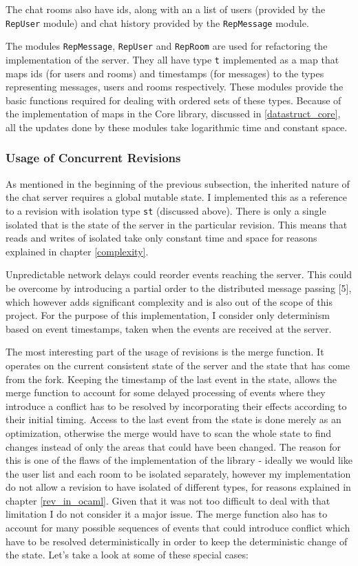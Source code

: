 \documentclass[12pt,twoside,notitlepage]{report}
\begin{document}
{The chat rooms also have ids, along with an a list of users (provided by the {\tt RepUser} module) and chat history provided by the {\tt RepMessage} module.

The modules {\tt RepMessage}, {\tt RepUser} and {\tt RepRoom} are used for refactoring the implementation of the server. They all have type {\tt t} implemented as a map that maps ids (for users and rooms) and timestamps (for messages) to the types representing messages, users and rooms respectively. These modules provide the basic functions required for dealing with ordered sets of these types. Because of the implementation of maps in the Core library, discussed in \ref{datastruct_core}, all the updates done by these modules take logarithmic time and constant space.     

\subsubsection{Usage of Concurrent Revisions}

As mentioned in the beginning of the previous subsection, the inherited nature of the chat server requires a global mutable state. I implemented this as a reference to a revision with isolation type {\tt st} (discussed above). There is only a single isolated that is the state of the server in the particular revision. This means that reads and writes of isolated take only constant time and space for reasons explained in chapter \ref{complexity}.

Unpredictable network delays could reorder events reaching the server. This could be overcome by introducing a partial order to the distributed message passing [5], which however adds significant complexity and is also out of the scope of this project. For the purpose of this implementation, I consider only determinism based on event timestamps, taken when the events are received at the server.

The most interesting part of the usage of revisions is the merge function. It operates on the current consistent state of the server and the state that has come from the fork. Keeping the timestamp of the last event in the state, allows the merge function to account for some delayed processing of events where they introduce a conflict has to be resolved by incorporating their effects according to their initial timing. Access to the last event from the state is done merely as an optimization, otherwise the merge would have to scan the whole state to find changes instead of only the areas that could have been changed. The reason for this is one of the flaws of the implementation of the library - ideally we would like the user list and each room to be isolated separately, however my implementation do not allow a revision to have isolated of different types, for reasons explained in chapter \ref{rev_in_ocaml}. Given that it was not too difficult to deal with that limitation I do not consider it a major issue. The merge function also has to account for many possible sequences of events that could introduce conflict which have to be resolved deterministically in order to keep the deterministic change of the state. Let's take a look at some of these special cases:

}
\end{document}
